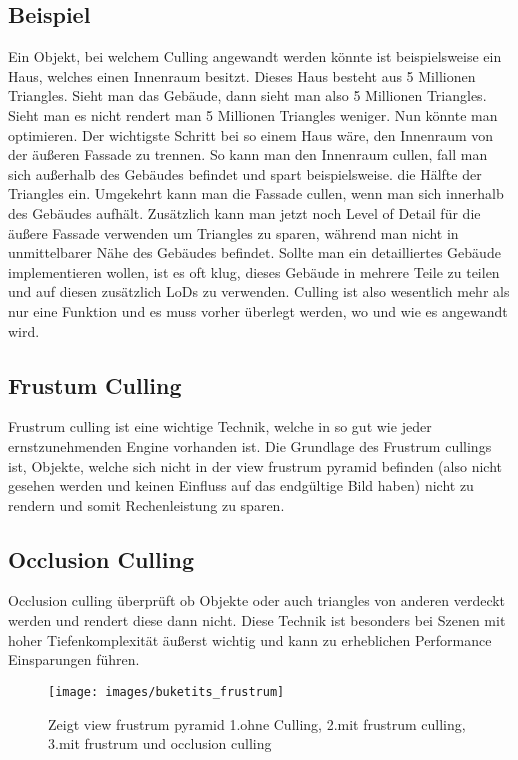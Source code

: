 \subsection{Beispiel}
Ein Objekt, bei welchem Culling angewandt werden könnte ist beispielsweise ein Haus, welches einen Innenraum besitzt. Dieses Haus besteht aus 5 Millionen Triangles. Sieht man das Gebäude, dann sieht man also 5 Millionen Triangles. Sieht man es nicht rendert man 5 Millionen Triangles weniger. Nun könnte man optimieren.
Der wichtigste Schritt bei so einem Haus wäre, den Innenraum von der äußeren Fassade zu trennen. So kann man den Innenraum cullen, fall man sich außerhalb des Gebäudes befindet und spart beispielsweise. die Hälfte der Triangles ein. Umgekehrt kann man die Fassade cullen, wenn man sich innerhalb des Gebäudes aufhält.
Zusätzlich kann man jetzt noch Level of Detail für die äußere Fassade verwenden um Triangles zu sparen, während man nicht in unmittelbarer Nähe des Gebäudes befindet. Sollte man ein detailliertes Gebäude implementieren wollen, ist es oft klug, dieses Gebäude in mehrere Teile zu teilen und auf diesen zusätzlich LoDs zu verwenden. Culling ist also wesentlich mehr als nur eine Funktion und es muss vorher überlegt werden, wo und wie es angewandt wird.

\cite{_cryengine_culling}

\subsection{Frustum Culling}
Frustrum culling ist eine wichtige Technik, welche in so gut wie jeder ernstzunehmenden Engine vorhanden ist. Die Grundlage des Frustrum cullings ist, Objekte, welche sich nicht in der view frustrum pyramid befinden (also nicht gesehen werden und keinen Einfluss auf das endgültige Bild haben) nicht zu rendern und somit Rechenleistung zu sparen.
\cite{_cryengine_culling}

\subsection{Occlusion Culling}
Occlusion culling überprüft ob Objekte oder auch triangles von anderen verdeckt werden und rendert diese dann nicht. Diese Technik ist besonders bei Szenen mit hoher Tiefenkomplexität äußerst wichtig und kann zu erheblichen Performance Einsparungen führen.
\cite{_cryengine_culling}

\begin{figure}[h]
	\centering
	\texttt{[image: images/buketits\_frustrum]}
	\caption{Zeigt view frustrum pyramid 1.ohne Culling, 2.mit frustrum culling, 3.mit frustrum und occlusion culling\cite{_culling}}
\end{figure}

